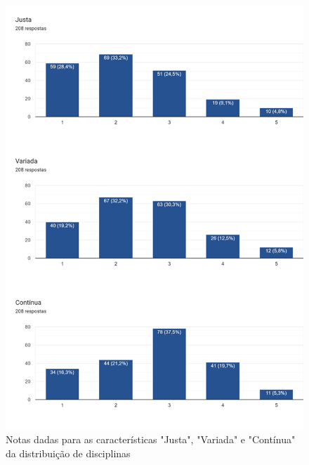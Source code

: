 
\begin{figure}[htbp]
  \centering
  \caption{\label{fig:6.0-Opiniao-1_3}Notas dadas para as características "Justa", "Variada" e "Contínua" da distribuição de disciplinas}
  \includegraphics[scale=0.4]{files/img/Forms/6.0-Opiniao-1_3.png}
\end{figure}


